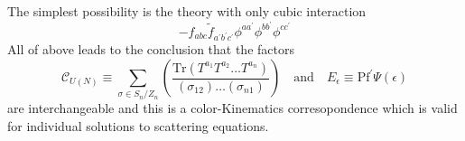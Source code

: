 \documentclass{beamer}
\begin{document}
\begin{frame}
    The simplest possibility is the theory with only cubic interaction
    \begin{equation*}
        -f_{abc}\tilde{f}_{a^\prime b^\prime c^\prime}\phi^{aa^\prime}\phi^{bb^\prime}\phi^{cc^\prime}
    \end{equation*}
    All of above leads to the conclusion that the factors 
    \begin{equation*}
        \mathcal{C}_{U(N)}\equiv \sum_{\sigma\in S_n/Z_n}\left(\frac{\mathrm{Tr}(T^{a_1}T^{a_2}\dots T^{a_n})}{(\sigma_{12})\dots (\sigma_{n1})}\right)\quad \mathrm{and} \quad E_\epsilon\equiv\mathrm{Pf}^{'}\Psi(\epsilon)
    \end{equation*}
    are interchangeable and this is a color-Kinematics corresopondence which is valid for individual solutions to scattering equations.
   
\end{frame}
\end{document}
